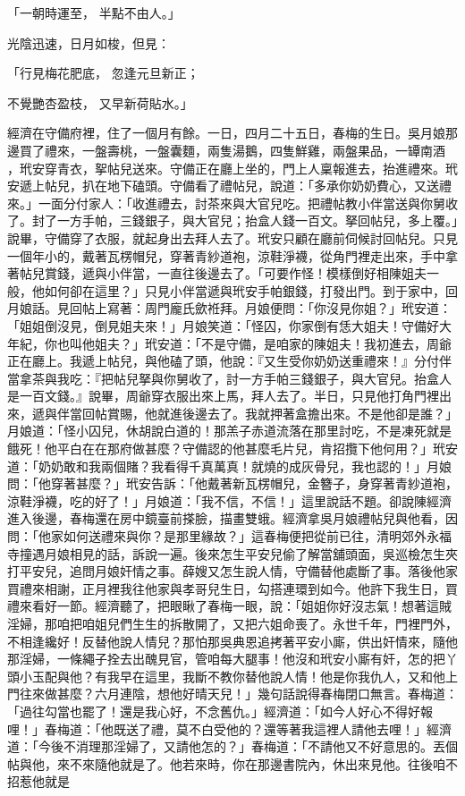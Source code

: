 「一朝時運至，  半點不由人。」

光陰迅速，日月如梭，但見：

「行見梅花肥底，  忽逢元旦新正；

不覺艷杏盈枝，  又早新荷貼水。」

經濟在守備府裡，住了一個月有餘。一日，四月二十五日，春梅的生日。吳月娘那邊買了禮來，一盤壽桃，一盤囊麵，兩隻湯鵝，四隻鮮雞，兩盤果品，一罈南酒 ，玳安穿青衣，挐帖兒送來。守備正在廳上坐的，門上人稟報進去，抬進禮來。玳安遞上帖兒，扒在地下磕頭。守備看了禮帖兒，說道：「多承你奶奶費心，又送禮來。」一面分付家人：「收進禮去，討茶來與大官兒吃。把禮帖教小伴當送與你舅收了。封了一方手帕，三錢銀子，與大官兒；抬盒人錢一百文。拏回帖兒，多上覆。」說畢，守備穿了衣服，就起身出去拜人去了。玳安只顧在廳前伺候討回帖兒。只見一個年小的，戴著瓦楞帽兒，穿著青紗道袍，涼鞋淨襪，從角門裡走出來，手中拿著帖兒賞錢，遞與小伴當，一直往後邊去了。「可要作怪！模樣倒好相陳姐夫一般，他如何卻在這里？」只見小伴當遞與玳安手帕銀錢，打發出門。到于家中，回月娘話。見回帖上寫著：周門龐氏歛袵拜。月娘便問：「你沒見你姐？」玳安道：「姐姐倒沒見，倒見姐夫來！」月娘笑道：「怪囚，你家倒有恁大姐夫！守備好大年紀，你也叫他姐夫？」玳安道：「不是守備，是咱家的陳姐夫！我初進去，周爺正在廳上。我遞上帖兒，與他磕了頭，他說：『又生受你奶奶送重禮來！』分付伴當拿茶與我吃：『把帖兒拏與你舅收了，討一方手帕三錢銀子，與大官兒。抬盒人是一百文錢。』說畢，周爺穿衣服出來上馬，拜人去了。半日，只見他打角門裡出來，遞與伴當回帖賞賜，他就進後邊去了。我就押著盒擔出來。不是他卻是誰？」月娘道：「怪小囚兒，休胡說白道的！那羔子赤道流落在那里討吃，不是凍死就是餓死！他平白在在那府做甚麼？守備認的他甚麼毛片兒，肯招攬下他何用？」玳安道：「奶奶敢和我兩個賭？我看得千真萬真！就燒的成灰骨兒，我也認的！」月娘問：「他穿著甚麼？」玳安告訴：「他戴著新瓦楞帽兒，金簪子，身穿著青紗道袍，涼鞋淨襪，吃的好了！」月娘道：「我不信，不信！」這里說話不題。卻說陳經濟進入後邊，春梅還在房中鏡臺前搽臉，描畫雙蛾。經濟拿吳月娘禮帖兒與他看，因問：「他家如何送禮來與你？是那里緣故？」這春梅便把從前已往，清明郊外永福寺撞遇月娘相見的話，訴說一遍。後來怎生平安兒偷了解當舖頭面，吳巡檢怎生夾打平安兒，追問月娘奸情之事。薛嫂又怎生說人情，守備替他處斷了事。落後他家買禮來相謝，正月裡我往他家與孝哥兒生日，勾搭連環到如今。他許下我生日，買禮來看好一節。經濟聽了，把眼瞅了春梅一眼，說：「姐姐你好沒志氣！想著這賊淫婦，那咱把咱姐兒們生生的拆散開了，又把六姐命喪了。永世千年，門裡門外，不相逢纔好！反替他說人情兒？那怕那吳典恩追拷著平安小廝，供出奸情來，隨他那淫婦，一條繩子拴去出醜見官，管咱每大腿事！他沒和玳安小廝有奸，怎的把丫頭小玉配與他？有我早在這里，我斷不教你替他說人情！他是你我仇人，又和他上門往來做甚麼？六月連陰，想他好晴天兒！」幾句話說得春梅閉口無言。春梅道：「過往勾當也罷了！還是我心好，不念舊仇。」經濟道：「如今人好心不得好報哩！」春梅道：「他既送了禮，莫不白受他的？還等著我這裡人請他去哩！」經濟道：「今後不消理那淫婦了，又請他怎的？」春梅道：「不請他又不好意思的。丟個帖與他，來不來隨他就是了。他若來時，你在那邊書院內，休出來見他。往後咱不招惹他就是